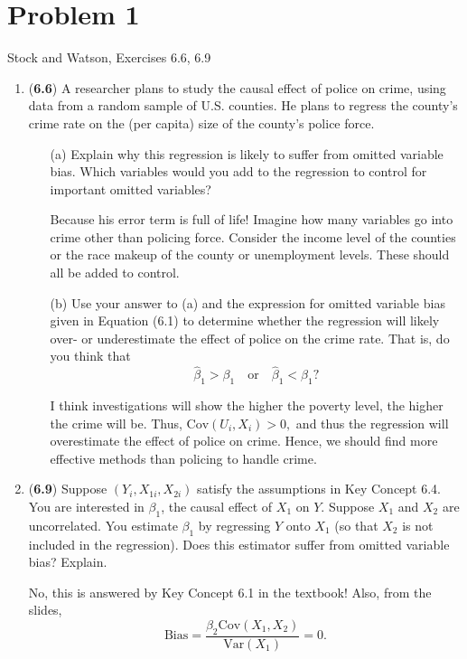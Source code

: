 \documentclass[11pt]{article}
\newcommand{\Bias}{\text{Bias}}
\newcommand{\Var}{\text{Var}}
\newcommand{\Cov}{\text{Cov}}
\begin{document}
	

	\psetheader
\section*{Problem 1 \heart}


Stock and Watson, Exercises 6.6, 6.9\\

\begin{enumerate}
    \item (\textbf{6.6})
A researcher plans to study the causal effect of police on crime, using data from a random sample of U.S. counties. He plans to regress the county’s crime rate on the (per capita) size of the county’s police force.

\begin{enumerate}
    \item[(a)] Explain why this regression is likely to suffer from omitted variable bias. Which variables would you add to the regression to control for important omitted variables?
\begin{solution}
    Because his error term is full of life! Imagine how many variables go into crime other than policing force. Consider the income level of the counties or the race makeup of the county or unemployment levels. These should all be added to control. 
\end{solution}
    \item[(b)] Use your answer to (a) and the expression for omitted variable bias given in Equation (6.1) to determine whether the regression will likely over- or underestimate the effect of police on the crime rate. That is, do you think that 
    \[
    \hat{\beta}_1 > \beta_1 \quad \text{or} \quad \hat{\beta}_1 < \beta_1?
    \]
    \begin{solution}
        I think investigations will show the higher the poverty level, the higher the crime will be. Thus, $\Cov(U_i, X_i)>0,$ and thus the regression will overestimate the effect of police on crime. Hence, we should find more effective methods than policing to handle crime. 
    \end{solution}
\end{enumerate}

\item (\textbf{6.9}) Suppose $(Y_i, X_{1i}, X_{2i})$ satisfy the assumptions in Key Concept 6.4. You are interested in $\beta_1$, the causal effect of $X_1$ on $Y$. Suppose $X_1$ and $X_2$ are uncorrelated. You estimate $\beta_1$ by regressing $Y$ onto $X_1$ (so that $X_2$ is not included in the regression). Does this estimator suffer from omitted variable bias? Explain.
\begin{solution}
    No, this is answered by Key Concept 6.1 in the textbook! Also, from the slides, 
    \[\Bias = \frac{\beta_2 \Cov(X_1, X_2)}{\Var(X_1)} = 0.\]
\end{solution}
\end{enumerate}
\end{document}
